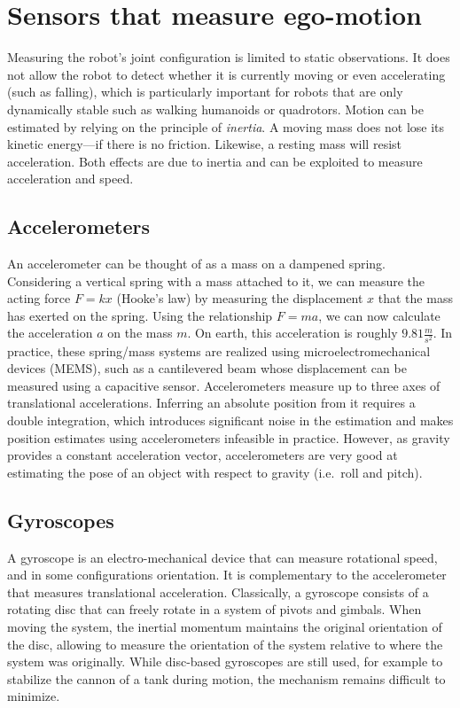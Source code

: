 \section{Sensors that measure ego-motion}\label{sec:sensors:inertia}

Measuring the robot's joint configuration is limited to static observations. It does not allow the robot to detect whether it is currently moving or even accelerating (such as falling), which is particularly important for robots that are only dynamically stable such as walking humanoids or quadrotors. Motion can be estimated by relying on the principle of \emph{inertia}. A moving mass does not lose its kinetic energy---if there is no friction. Likewise, a resting mass will resist acceleration. Both effects are due to inertia  and can be exploited to measure acceleration and speed.

\subsection{Accelerometers}

An accelerometer can be thought of as a mass on a dampened spring. Considering a vertical spring with a mass attached to it, we can measure the acting force $F=kx$ (Hooke's law) by measuring the displacement $x$ that the mass has exerted on the spring.
Using the relationship $F=ma$, we can now calculate the acceleration $a$ on the mass $m$. On earth, this acceleration is roughly $9.81\frac{m}{s^2}$.
In practice, these spring/mass systems are realized using microelectromechanical devices (MEMS), such as a cantilevered beam whose displacement can be measured using a capacitive sensor. Accelerometers measure up to three axes of translational accelerations. Inferring an absolute position from it requires a double integration, which introduces significant noise in the estimation and makes position estimates using accelerometers infeasible in practice.
However, as gravity provides a constant acceleration vector, accelerometers are very good at estimating the pose of an object with respect to gravity (i.e.\ roll and pitch).

\subsection{Gyroscopes}\label{sec:gyroscopes}

A gyroscope is an electro-mechanical device that can measure rotational speed, and in some configurations orientation. It is complementary to the accelerometer that measures translational acceleration. Classically, a gyroscope consists of a rotating disc that can freely rotate in a system of pivots and gimbals. When moving the system, the inertial momentum maintains the original orientation of the disc, allowing to measure the orientation of the system relative to where the system was originally. While disc-based gyroscopes are still used, for example to stabilize the cannon of a tank during motion, the mechanism remains difficult to minimize.

